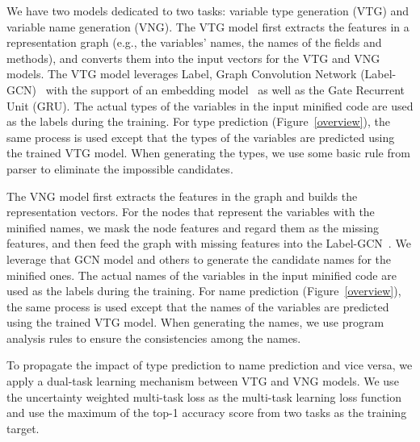 We have two models dedicated to two tasks: variable type generation
(VTG) and variable name generation (VNG). The VTG model first extracts
the features in a representation graph (e.g., the variables' names,
the names of the fields and methods), and converts them into the input
vectors for the VTG and VNG models. The VTG model leverages Label,
Graph Convolution Network (Label-GCN)~\cite{label-gcn} with the
support of an embedding model~\cite{pennington2014glove} as well as
the Gate Recurrent Unit (GRU). The actual types of the
variables in the input minified code are used as the labels during the
training. For type prediction (Figure~\ref{overview}), the same
process is used except that the types of the variables are predicted
using the trained VTG model. When generating the types, we use some
basic rule from parser to eliminate the impossible candidates.

The VNG model first extracts the features in the graph and builds the
representation vectors. For the nodes that represent the variables
with the minified names, we mask the node features and regard them as
the missing features, and then feed the graph with missing features
into the Label-GCN~\cite{label-gcn}. We leverage that GCN model and
others to generate the candidate names for the minified ones. The
actual names of the variables in the input minified code are used as
the labels during the training. For name prediction
(Figure~\ref{overview}), the same process is used except that the
names of the variables are predicted using the trained VTG model. When
generating the names, we use program analysis rules to ensure the
consistencies among the names.

To propagate the impact of type prediction to name prediction and vice
versa, we apply a dual-task learning mechanism between VTG and VNG
models.  We use the uncertainty weighted multi-task loss as the
multi-task learning loss function and use the maximum of the top-1
accuracy score from two tasks as the training target.






